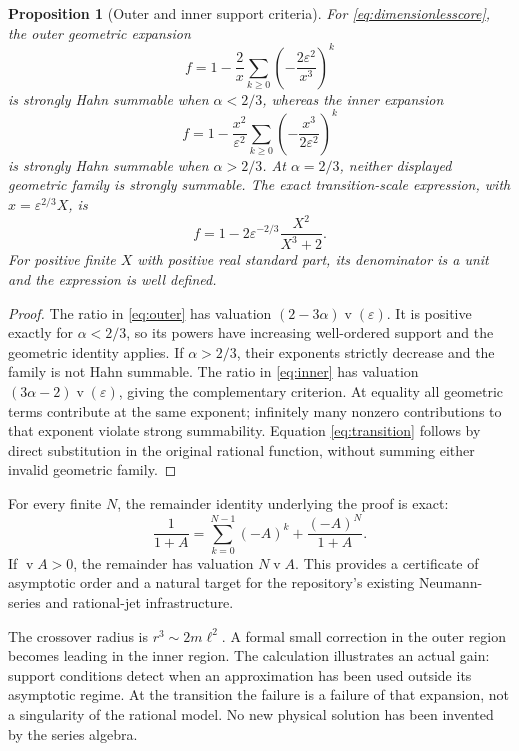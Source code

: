 \documentclass[11pt,a4paper]{article}
\numberwithin{equation}{section}
\newtheorem{proposition}[theorem]{Proposition}
\theoremstyle{definition}
\theoremstyle{remark}
\newcommand{\val}{\operatorname{v}}
\begin{document}
\begin{proposition}[Outer and inner support criteria]\label{prop:matching}
For \eqref{eq:dimensionlesscore}, the outer geometric expansion
\begin{equation}\label{eq:outer}
f=1-\frac2x\sum_{k\ge0}
                  \left(-\frac{2\varepsilon^2}{x^3}\right)^k
\end{equation}
is strongly Hahn summable when $\alpha<2/3$, whereas the inner expansion
\begin{equation}\label{eq:inner}
f=1-\frac{x^2}{\varepsilon^2}\sum_{k\ge0}
                  \left(-\frac{x^3}{2\varepsilon^2}\right)^k
\end{equation}
is strongly Hahn summable when $\alpha>2/3$.
At $\alpha=2/3$, neither displayed geometric family is strongly summable.
The exact transition-scale expression, with $x=\varepsilon^{2/3}X$, is
\begin{equation}\label{eq:transition}
f=1-2\varepsilon^{-2/3}\frac{X^2}{X^3+2}.
\end{equation}
For positive finite $X$ with positive real standard part, its denominator is a
unit and the expression is well defined.
\end{proposition}
\begin{proof}
The ratio in \eqref{eq:outer} has valuation
$(2-3\alpha)\val(\varepsilon)$. It is positive exactly for $\alpha<2/3$,
so its powers have increasing well-ordered support and the geometric identity
applies. If $\alpha>2/3$, their exponents strictly decrease and the family is
not Hahn summable. The ratio in \eqref{eq:inner} has valuation
$(3\alpha-2)\val(\varepsilon)$, giving the complementary criterion.
At equality all geometric terms contribute at the same exponent; infinitely
many nonzero contributions to that exponent violate strong summability.
Equation \eqref{eq:transition} follows by direct substitution in the original
rational function, without summing either invalid geometric family.
\end{proof}

For every finite $N$, the remainder identity underlying the proof is exact:
\begin{equation}\label{eq:remainder}
\frac1{1+A}=\sum_{k=0}^{N-1}(-A)^k+\frac{(-A)^N}{1+A}.
\end{equation}
If $\val A>0$, the remainder has valuation $N\val A$. This provides a
certificate of asymptotic order and a natural target for the repository's
existing Neumann-series and rational-jet infrastructure.

The crossover radius is $r^3\sim2m\ell^2$. A formal small correction in the
outer region becomes leading in the inner region. The calculation illustrates
an actual gain: support conditions detect when an approximation has been used
outside its asymptotic regime. At the transition the failure is a failure of
that expansion, not a singularity of the rational model. No new physical
solution has been invented by the series algebra.
\end{document}
